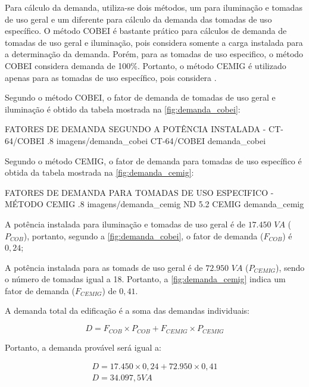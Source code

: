 Para cálculo da demanda, utiliza-se dois métodos, um para iluminação e tomadas de uso geral e um diferente para cálculo da demanda das tomadas de uso específico. O método COBEI é bastante prático para cálculos de demanda de tomadas de uso geral e iluminação, pois considera somente a carga instalada para a determinação da demanda. Porém, para as tomadas de uso especifico, o método COBEI considera demanda de 100\%. Portanto, o método CEMIG é utilizado apenas para as tomadas de uso específico, pois considera .

Segundo o método COBEI, o fator de demanda de tomadas de uso geral e iluminação é obtido da tabela mostrada na \autoref{fig:demanda_cobei}:

\figura
{FATORES DE DEMANDA SEGUNDO A POTÊNCIA INSTALADA - CT-64/COBEI} %
{.8} %
{imagens/demanda_cobei} %
{CT-64/COBEI} %
{demanda_cobei} %
{}
{}

Segundo o método CEMIG, o fator de demanda para tomadas de uso específico é obtida da tabela mostrada na \autoref{fig:demanda_cemig}:

\figura
{FATORES DE DEMANDA PARA TOMADAS DE USO ESPECIFICO - MÉTODO CEMIG} %
{.8} %
{imagens/demanda_cemig} %
{ND 5.2 CEMIG} %
{demanda_cemig} %
{}
{}

A potência instalada para iluminação e tomadas de uso geral é de $17.450$ $VA$ ($P_{COB}$), portanto, segundo a \autoref{fig:demanda_cobei}, o fator de demanda ($F_{COB}$) é $0,24$;

A potência instalada para as tomads de uso geral é de $72.950$ $VA$ ($P_{CEMIG}$), sendo o número de tomadas igual a 18. Portanto, a \autoref{fig:demanda_cemig} indica um fator de demanda ($F_{CEMIG}$) de $0,41$.

A demanda total da edificação é a soma das demandas individuais:

\begin{equation}
	D = F_{COB} \times P_{COB} + F_{CEMIG} \times P_{CEMIG}
\end{equation}

Portanto, a demanda provável será igual a:

\begin{equation}
	\begin{split}
		D = 17.450 \times 0,24 + 72.950 \times 0,41\\
		D = 34.097,5 VA
	\end{split}
\end{equation}

